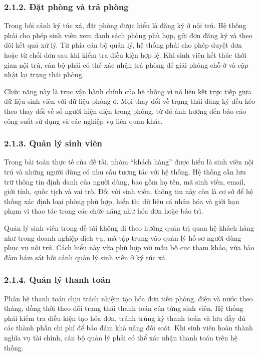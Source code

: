 \documentclass[12pt]{article}
\begin{document}
\subsubsection*{2.1.2. Đặt phòng và trả phòng}
Trong bối cảnh ký túc xá, đặt phòng được hiểu là đăng ký ở nội trú. Hệ thống phải cho phép sinh viên xem danh sách phòng phù hợp, gửi đơn đăng ký và theo dõi kết quả xử lý. Từ phía cán bộ quản lý, hệ thống phải cho phép duyệt đơn hoặc từ chối đơn sau khi kiểm tra điều kiện hợp lệ. Khi sinh viên kết thúc thời gian nội trú, cán bộ phải có thể xác nhận trả phòng để giải phóng chỗ ở và cập nhật lại trạng thái phòng.

Chức năng này là trục vận hành chính của hệ thống vì nó liên kết trực tiếp giữa dữ liệu sinh viên với dữ liệu phòng ở. Mọi thay đổi về trạng thái đăng ký đều kéo theo thay đổi về số người hiện diện trong phòng, từ đó ảnh hưởng đến báo cáo công suất sử dụng và các nghiệp vụ liên quan khác.

\subsubsection*{2.1.3. Quản lý sinh viên}

Trong bài toán thực tế của đề tài, nhóm “khách hàng” được hiểu là sinh viên nội trú và những người dùng có nhu cầu tương tác với hệ thống. Hệ thống cần lưu trữ thông tin định danh của người dùng, bao gồm họ tên, mã sinh viên, email, giới tính, quốc tịch và vai trò. Đối với sinh viên, thông tin này còn là cơ sở để hệ thống xác định loại phòng phù hợp, hiển thị dữ liệu cá nhân hóa và giới hạn phạm vi thao tác trong các chức năng như hóa đơn hoặc bảo trì.

Quản lý sinh viên trong đề tài không đi theo hướng quản trị quan hệ khách hàng như trong doanh nghiệp dịch vụ, mà tập trung vào quản lý hồ sơ người dùng phục vụ nội trú. Cách hiểu này vừa phù hợp với mẫu bố cục tham khảo, vừa bảo đảm bám sát bối cảnh quản lý sinh viên ở ký túc xá.

\subsubsection*{2.1.4. Quản lý thanh toán}

Phân hệ thanh toán chịu trách nhiệm tạo hóa đơn tiền phòng, điện và nước theo tháng, đồng thời theo dõi trạng thái thanh toán của từng sinh viên. Hệ thống phải kiểm tra điều kiện tạo hóa đơn, tránh trùng kỳ thanh toán và lưu đầy đủ các thành phần chi phí để bảo đảm khả năng đối soát. Khi sinh viên hoàn thành nghĩa vụ tài chính, cán bộ quản lý phải có thể xác nhận thanh toán trên hệ thống.
\end{document}

